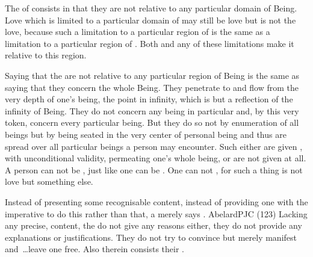 
\pa The  of  consists in that they are
not relative to any particular domain of Being.  Love which is limited
to a particular domain of  may still be love but is not
the  love, because such a limitation to a particular
region of  is the same as a limitation to a particular
region of . Both and any of these limitations make it
relative to this region. 

Saying that the  are not relative to any particular region
of Being is the same as saying that they concern the whole Being.  They
penetrate to and flow from the very depth of one's being, the point in infinity,
which is but a reflection of the infinity of Being. They do not concern any
being in particular and, by this very token, concern every particular being. But
they do so not by enumeration of all beings but by being seated in the very
center of personal being and thus are spread over all particular beings a person
may encounter.  Such  either are given , with unconditional
validity, permeating one's whole being, or are not given at all.  A person can
not be , just like one can be . One
can not , for such a thing is not love but
something else.


\pa
Instead of presenting some recognisable content, instead of
providing one with the imperative to do this rather than that, a 
merely says . \citet{For commandments from the Lord should 
  not be expected in matters that have an obvious usefulness.}{AbelardPJC}{
  (123)}  Lacking any precise,  
content, the  do not give any reasons either, they do not
provide any explanations or justifications.  They do not try to
convince but merely {manifest} and~\ldots  leave one 
free.  Also therein consists their .

